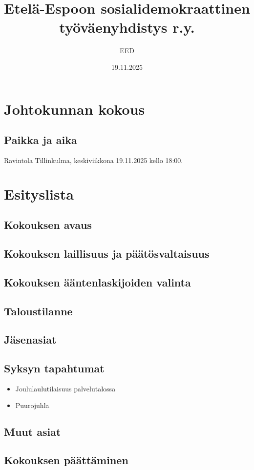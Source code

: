 \documentclass[a4paper,12pt]{article}
\title{Etelä-Espoon sosialidemokraattinen työväenyhdistys r.y.}
\author{EED}
\date{19.11.2025}
\begin{document}
\maketitle
\tableofcontents
\section*{Johtokunnan kokous}
\subsection*{Paikka ja aika}
Ravintola Tillinkulma, keskiviikkona 19.11.2025 kello 18:00.
\section*{Esityslista}
\subsection{Kokouksen avaus}
\subsection{Kokouksen laillisuus ja päätösvaltaisuus}
\subsection{Kokouksen ääntenlaskijoiden valinta}
\subsection{Taloustilanne}
\subsection{Jäsenasiat}
\subsection{Syksyn tapahtumat}
\begin{itemize}
\item{Joululaulutilaisuus palvelutalossa}
\item{Puurojuhla}
\end{itemize}
\subsection{Muut asiat}
\subsection{Kokouksen päättäminen}
\end{document}
